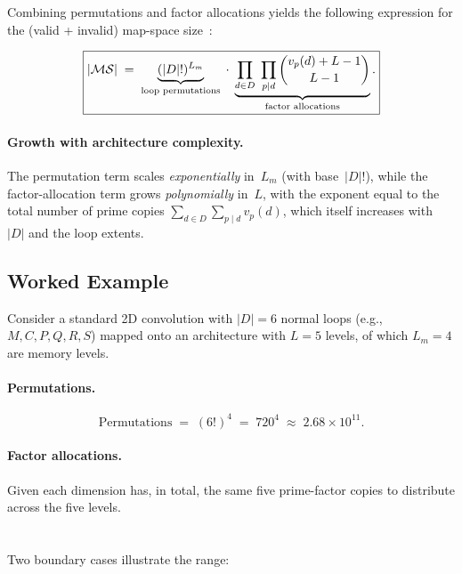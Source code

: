 Combining permutations and factor allocations yields the following
expression for the (valid + invalid) map-space
size~\cite{ronzani2025quickflow}:

\begin{equation}
\label{eq:ms-cardinality}
\boxed{%
  |\mathcal{MS}|
  \;=\;
  \underbrace{(|D|!)^{L_m}}_{\text{loop permutations}}
  \;\cdot\;
  \underbrace{
    \prod_{d \in D}\;\prod_{p \mid d}
      \binom{v_p(d) + L - 1}{L - 1}
  }_{\text{factor allocations}}.
}
\end{equation}

\paragraph{Growth with architecture complexity.}
The permutation term scales \emph{exponentially} in~$L_m$ (with
base~$|D|!$), while the factor-allocation term grows
\emph{polynomially} in~$L$, with the exponent equal to the total
number of prime copies
$\sum_{d \in D}\sum_{p \mid d} v_p(d)$,
which itself increases with~$|D|$ and the loop extents.


\subsection{Worked Example}
\label{sec:mapspace-example}

Consider a standard 2D convolution with $|D| = 6$ normal loops
(e.g., $M, C, P, Q, R, S$) mapped onto an architecture with $L = 5$
levels, of which $L_m = 4$ are memory levels.

\paragraph{Permutations.}
\[
  \text{Permutations}
  \;=\; (6!)^{4}
  \;=\; 720^{4}
  \;\approx\; 2.68 \times 10^{11}.
\]

\paragraph{Factor allocations.}
Given each dimension has, in total, the same five prime-factor copies to
distribute across the five levels. \\\\\\
Two boundary cases illustrate the range:

